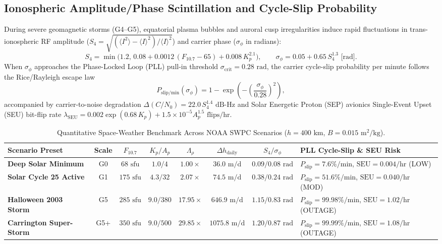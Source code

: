 \documentclass[11pt,a4paper,reqno]{article}
\theoremstyle{plain}
\theoremstyle{definition}
\theoremstyle{remark}
\numberwithin{equation}{section}
\renewcommand{\arraystretch}{1.08}
\begin{document}
\subsection{Ionospheric Amplitude/Phase Scintillation and Cycle-Slip Probability}
During severe geomagnetic storms (G4--G5), equatorial plasma bubbles and auroral cusp irregularities induce rapid fluctuations in trans-ionospheric RF amplitude ($S_4 = \sqrt{(\langle I^2 \rangle - \langle I \rangle^2)/\langle I \rangle^2}$) and carrier phase ($\sigma_\phi$ in radians):
\begin{equation}
  S_4 = \min\!\big(1.2,\, 0.08 + 0.0012\,(F_{10.7} - 65) + 0.008\,K_p^{2.1}\big), \qquad \sigma_\phi = 0.05 + 0.65\,S_4^{1.3}\text{ [rad]}.
  \label{eq:s4_sigmaphi}
\end{equation}
When $\sigma_\phi$ approaches the Phase-Locked Loop (PLL) pull-in threshold $\sigma_{\text{crit}} = 0.28\text{ rad}$, the carrier cycle-slip probability per minute follows the Rice/Rayleigh escape law
\begin{equation}
  P_{\text{slip/min}}(\sigma_\phi) = 1 - \exp\!\left(-\left(\frac{\sigma_\phi}{0.28}\right)^2\right),
  \label{eq:cycle_slip_prob}
\end{equation}
accompanied by carrier-to-noise degradation $\Delta(C/N_0) = 22.0\,S_4^{1.4}\text{ dB-Hz}$ and Solar Energetic Proton (SEP) avionics Single-Event Upset (SEU) bit-flip rate $\lambda_{\text{SEU}} = 0.002\exp(0.68\,K_p) + 1.5 \times 10^{-5} A_p^{1.5}\text{ flips/hr}$.

\begin{table}[H]
\centering
\caption{Quantitative Space-Weather Benchmark Across NOAA SWPC Scenarios ($h = 400\text{ km}$, $B = 0.015\text{ m}^2/\text{kg}$).}
\label{tab:space_weather_benchmarks}
\footnotesize
\setlength{\tabcolsep}{4pt}
\renewcommand{\arraystretch}{1.22}
\begin{tabularx}{\textwidth}{l c c c c c c X}
\toprule
\textbf{Scenario Preset} & \textbf{Scale} & $F_{10.7}$ & $K_p / A_p$ & $\Lambda_\rho$ & $\Delta h_{\text{daily}}$ & $S_4 / \sigma_\phi$ & \textbf{PLL Cycle-Slip \& SEU Risk} \\
\midrule
\textbf{Deep Solar Minimum} & G0 & $68\text{ sfu}$ & $1.0 / 4$ & $1.00\times$ & $36.0\text{ m/d}$ & $0.09 / 0.08\text{ rad}$ & $P_{\text{slip}} = 7.6\%\text{/min}$, $\text{SEU} = 0.004\text{/hr}$ (LOW) \\
\textbf{Solar Cycle 25 Active} & G1 & $175\text{ sfu}$ & $4.3 / 32$ & $2.07\times$ & $74.5\text{ m/d}$ & $0.38 / 0.24\text{ rad}$ & $P_{\text{slip}} = 51.6\%\text{/min}$, $\text{SEU} = 0.040\text{/hr}$ (MOD) \\
\textbf{Halloween 2003 Storm} & G5 & $285\text{ sfu}$ & $9.0 / 380$ & $17.95\times$ & $646.9\text{ m/d}$ & $1.15 / 0.83\text{ rad}$ & $P_{\text{slip}} = 99.98\%\text{/min}$, $\text{SEU} = 1.02\text{/hr}$ (OUTAGE) \\
\textbf{Carrington Super-Storm} & G5+ & $350\text{ sfu}$ & $9.0 / 500$ & $29.85\times$ & $1075.8\text{ m/d}$ & $1.20 / 0.87\text{ rad}$ & $P_{\text{slip}} = 99.99\%\text{/min}$, $\text{SEU} = 1.08\text{/hr}$ (OUTAGE) \\
\bottomrule
\end{tabularx}
\end{table}
\end{document}
